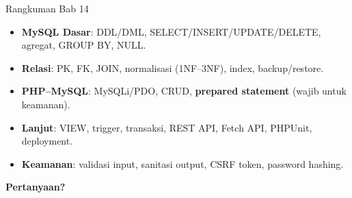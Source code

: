 \documentclass[handout]{beamer}
\begin{document}
\begin{frame}{Rangkuman Bab 14}
	\begin{itemize}
		\item \textbf{MySQL Dasar}: DDL/DML, SELECT/INSERT/UPDATE/DELETE, agregat, GROUP BY, NULL.
		\item \textbf{Relasi}: PK, FK, JOIN, normalisasi (1NF--3NF), index, backup/restore.
		\item \textbf{PHP--MySQL}: MySQLi/PDO, CRUD, \textbf{prepared statement} (wajib untuk keamanan).
		\item \textbf{Lanjut}: VIEW, trigger, transaksi, REST API, Fetch API, PHPUnit, deployment.
		\item \textbf{Keamanan}: validasi input, sanitasi output, CSRF token, password hashing.
	\end{itemize}
\end{frame}

\begin{frame}{}
	\centering
	\vfill
	\textbf{\Large Pertanyaan?}
	\vfill
\end{frame}
\end{document}
